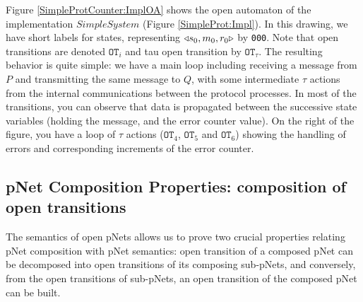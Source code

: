 \documentclass{lmcs}
\begin{document}
    Figure \ref{SimpleProtCounter:ImplOA} shows the open automaton of the implementation $SimpleSystem$ (Figure \ref{SimpleProt:Impl}). In this drawing, we have short labels for states, representing $\triangleleft{s_0,m_0,r_0}\triangleright$ by \texttt{000}. Note that open transitions are denoted $\texttt{OT}_i$ and tau open transition by  $\texttt{OT}_{\tau}$. The resulting behavior is quite simple:  we have a main loop including receiving a message from $P$ and transmitting the same message to $Q$, with some intermediate $\tau$ actions from the internal communications between the protocol processes. In most of the transitions, you can observe that data is propagated between the successive state variables (holding the message, and the error counter value). On the right of the figure, you have a loop of $\tau$ actions ($\texttt{OT}_4$, $\texttt{OT}_5$ and $\texttt{OT}_6$)  showing the handling of errors and corresponding increments of the error counter.
    
    
  

\subsection{pNet Composition Properties: composition of open transitions}
The semantics of open pNets allows us to prove two crucial properties relating pNet composition with pNet semantics: open transition of a composed pNet can be decomposed into open transitions of its composing sub-pNets, and conversely, from the open transitions of sub-pNets,  an open transition of the composed pNet can be built.
\end{document}
